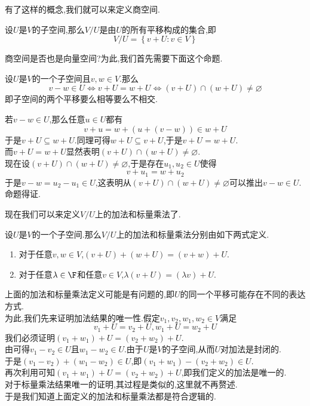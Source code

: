 \documentclass{ctexart}
\begin{document}
有了这样的概念,我们就可以来定义商空间.
\begin{definition}[2.2 定义:商空间]
    设$U$是$V$的子空间,那么$V/U$是由$U$的所有平移构成的集合,即
    $$V/U=\left\{v+U:v\in V\right\}$$
\end{definition}\noindent
商空间是否也是向量空间?为此,我们首先需要下面这个命题.
\begin{formal}[2.3 子空间的平移的关系]
    设$U$是$V$的一个子空间且$v,w\in V$.那么
    $$v-w\in U\Leftrightarrow v+U=w+U\Leftrightarrow \left(v+U\right)\cap\left(w+U\right)\neq\varnothing$$
    即子空间的两个平移要么相等要么不相交.
\end{formal}
\begin{solution}[Proof.]
    若$v-w\in U$,那么任意$u\in U$都有
    $$v+u=w+\left(u+(v-w)\right)\in w+U$$
    于是$v+U\subseteq w+U$.同理可得$w+U\subseteq v+U$,于是$v+U=w+U$.\\
    而$v+U=w+U$显然表明$(v+U)\cap(w+U)\neq\varnothing$.\\
    现在设$(v+U)\cap(w+U)\neq\varnothing$,于是存在$u_1,u_2\in U$使得$$v+u_1=w+u_2$$
    于是$v-w=u_2-u_1\in U$,这表明从$(v+U)\cap(w+U)\neq\varnothing$可以推出$v-w\in U$.\\
    命题得证.
\end{solution}\noindent
现在我们可以来定义$V/U$上的加法和标量乘法了.
\begin{definition}[2.4 定义:商空间上的加法和标量乘法]
    设$U$是$V$的一个子空间.那么$V/U$上的加法和标量乘法分别由如下两式定义.
    \begin{enumerate}[label=\tbf{(\arabic*)}]
        \item 对于任意$v,w\in V$,$(v+U)+(w+U)=(v+w)+U$.
        \item 对于任意$\lambda\in\F$和任意$v\in V$,$\lambda(v+U)=(\lambda v)+U$.
    \end{enumerate}
\end{definition}
\begin{solution}[Proof.]
    上面的加法和标量乘法定义可能是有问题的,即$U$的同一个平移可能存在不同的表达方式.\\
    为此,我们先来证明加法结果的唯一性.假定$v_1,v_2,w_1,w_2\in V$满足
    $$v_1+U=v_2+U,w_1+U=w_2+U$$
    我们必须证明$(v_1+w_1)+U=(v_2+w_2)+U$.\\
    由可得$v_1-v_2\in U$且$w_1-w_2\in U$.由于$U$是$V$的子空间,从而$U$对加法是封闭的.\\
    于是$(v_1-v_2)+(w_1-w_2)\in U$,即$(v_1+w_1)-(v_2+w_2)\in U$.\\
    再次利用可知$(v_1+w_1)+U=(v_2+w_2)+U$,即我们定义的加法是唯一的.\\
    对于标量乘法结果唯一的证明,其过程是类似的,这里就不再赘述.\\
    于是我们知道上面定义的加法和标量乘法都是符合逻辑的.
\end{solution}\noindent
\end{document}
